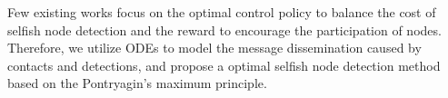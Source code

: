 %

Few existing works focus on
the optimal control policy to balance
the cost of selfish node detection
and the reward to encourage the participation of nodes.
Therefore, we utilize ODEs to model the message dissemination
caused by contacts and detections,
and propose a optimal selfish node detection method
based on the Pontryagin's maximum principle.
